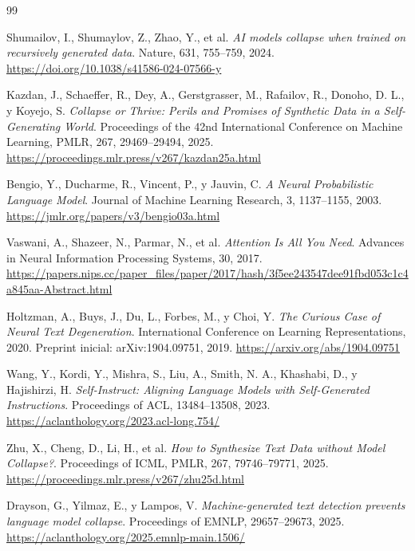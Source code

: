 \documentclass[12pt,letterpaper]{article}
\begin{document}
\clearpage
{}
{}
\begin{thebibliography}{99}

Shumailov, I., Shumaylov, Z., Zhao, Y., et al.
\textit{AI models collapse when trained on recursively generated data}.
Nature, 631, 755--759, 2024.
\url{https://doi.org/10.1038/s41586-024-07566-y}

Kazdan, J., Schaeffer, R., Dey, A., Gerstgrasser, M., Rafailov, R.,
Donoho, D. L., y Koyejo, S.
\textit{Collapse or Thrive: Perils and Promises of Synthetic Data in a
Self-Generating World}.
Proceedings of the 42nd International Conference on Machine Learning,
PMLR, 267, 29469--29494, 2025.
\url{https://proceedings.mlr.press/v267/kazdan25a.html}

Bengio, Y., Ducharme, R., Vincent, P., y Jauvin, C.
\textit{A Neural Probabilistic Language Model}.
Journal of Machine Learning Research, 3, 1137--1155, 2003.
\url{https://jmlr.org/papers/v3/bengio03a.html}

Vaswani, A., Shazeer, N., Parmar, N., et al.
\textit{Attention Is All You Need}.
Advances in Neural Information Processing Systems, 30, 2017.
\url{https://papers.nips.cc/paper_files/paper/2017/hash/3f5ee243547dee91fbd053c1c4a845aa-Abstract.html}

Holtzman, A., Buys, J., Du, L., Forbes, M., y Choi, Y.
\textit{The Curious Case of Neural Text Degeneration}.
International Conference on Learning Representations, 2020.
Preprint inicial: arXiv:1904.09751, 2019.
\url{https://arxiv.org/abs/1904.09751}

Wang, Y., Kordi, Y., Mishra, S., Liu, A., Smith, N. A.,
Khashabi, D., y Hajishirzi, H.
\textit{Self-Instruct: Aligning Language Models with Self-Generated Instructions}.
Proceedings of ACL, 13484--13508, 2023.
\url{https://aclanthology.org/2023.acl-long.754/}

Zhu, X., Cheng, D., Li, H., et al.
\textit{How to Synthesize Text Data without Model Collapse?}.
Proceedings of ICML, PMLR, 267, 79746--79771, 2025.
\url{https://proceedings.mlr.press/v267/zhu25d.html}

Drayson, G., Yilmaz, E., y Lampos, V.
\textit{Machine-generated text detection prevents language model collapse}.
Proceedings of EMNLP, 29657--29673, 2025.
\url{https://aclanthology.org/2025.emnlp-main.1506/}


\end{thebibliography}
\end{document}
